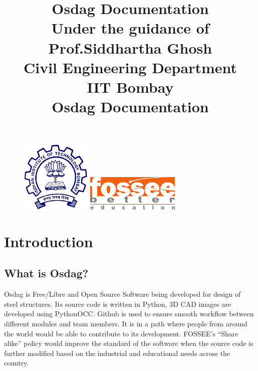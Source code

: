 \documentclass[11pt,a4paper]{report}
\begin{document}
\begin{figure}
\centering
\includegraphics[width = 0.3\textwidth]{iit}
\hspace{1cm}
\includegraphics[width = 0.4\textwidth]{fossee-logo.png}
\end{figure}

\title{\textbf{\textbf{Osdag Documentation}}\vspace{20mm} \\
\small Under the guidance of \\ \vspace{5mm}
\large \textbf{Prof.Siddhartha Ghosh} \vspace{1mm}\\ Civil Engineering Department \\ IIT Bombay \\
}

\title{\textbf{\textbf{Osdag Documentation}}}

\newpage
\maketitle



\tableofcontents

\chapter{\textbf{Introduction}}

\section{What is Osdag?}

\noindent Osdag is Free/Libre and Open Source Software being developed for design of steel structures. Its source code is written in Python, 3D CAD images are developed using PythonOCC. Github is used to ensure smooth workflow between different modules and team members. It is in a path where people from around the world would be able to contribute to its development. FOSSEE's ``Share alike'' policy would improve the standard of the software when the source code is further modified based on the industrial and educational needs across the country.
\end{document}
